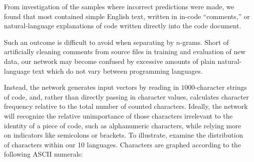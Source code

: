 \documentclass{article}
\begin{document}
From investigation of the samples where incorrect predictions were made, we found that most contained simple English text, written in in-code ``comments,'' or natural-language explanations of code written directly into the code document.

Such an outcome is difficult to avoid when separating by $n$-grams. Short of artificially cleaning comments from source files in training and evaluation of new data, our network may become confused by excessive amounts of plain natural-language text which do not vary between programming languages.

Instead, the network generates input vectors by reading in $1000$-character strings of code, and, rather than directly passing in character values, calculates character frequency relative to the total number of counted characters. Ideally, the network will recognize the relative unimportance of those characters irrelevant to the identity of a piece of code, such as alphanumeric characters, while relying more on indicators like semicolons or brackets. To illustrate, examine the distribution of characters within our 10 languages. Characters are graphed according to the following ASCII numerals:
\end{document}
